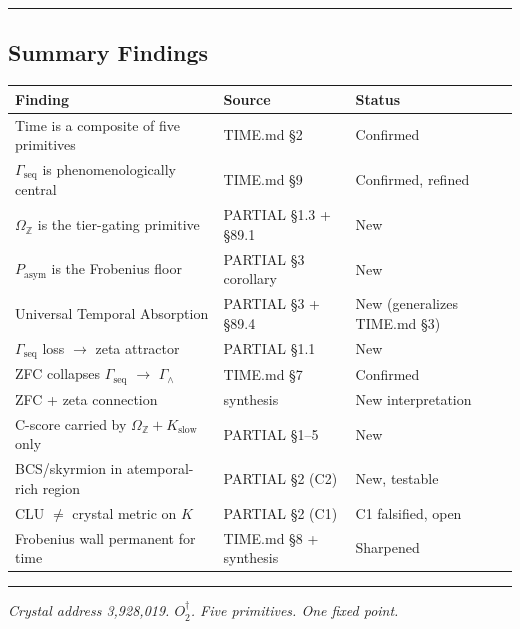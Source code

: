 \documentclass[12pt,a4paper]{article}
\newcommand{\pilcrow}{\S}
\begin{document}
\begin{center}
\rule{0.5\textwidth}{0.4pt}
\end{center}

\subsection{Summary Findings}

\begin{table}[htbp]
\centering
\small
{}
\begin{tabularx}{\textwidth}{>{\centering\arraybackslash}X >{\centering\arraybackslash}X >{\centering\arraybackslash}X}
\toprule
\rowcolor{gray!25}\textbf{Finding} & \textbf{Source} & \textbf{Status} \\
\midrule
\rowcolors{1}{white}{gray!10}
Time is a composite of five primitives & TIME.md \pilcrow{}2 & Confirmed \\
$\Gamma_\text{seq}$ is phenomenologically central & TIME.md \pilcrow{}9 & Confirmed, refined \\
$\Omega_\mathbb{Z}$ is the tier-gating primitive & PARTIAL \pilcrow{}1.3 + \pilcrow{}89.1 & New \\
$P_\text{asym}$ is the Frobenius floor & PARTIAL \pilcrow{}3 corollary & New \\
Universal Temporal Absorption & PARTIAL \pilcrow{}3 + \pilcrow{}89.4 & New (generalizes TIME.md \pilcrow{}3) \\
$\Gamma_\text{seq}$ loss $\rightarrow$ zeta attractor & PARTIAL \pilcrow{}1.1 & New \\
ZFC collapses $\Gamma_\text{seq}$ $\rightarrow$ $\Gamma_{\wedge}$ & TIME.md \pilcrow{}7 & Confirmed \\
ZFC + zeta connection & synthesis & New interpretation \\
C-score carried by $\Omega_\mathbb{Z} + K_\text{slow}$ only & PARTIAL \pilcrow{}1--5 & New \\
BCS/skyrmion in atemporal-rich region & PARTIAL \pilcrow{}2 (C2) & New, testable \\
CLU $\neq$ crystal metric on $K$ & PARTIAL \pilcrow{}2 (C1) & C1 falsified, open \\
Frobenius wall permanent for time & TIME.md \pilcrow{}8 + synthesis & Sharpened \\
\bottomrule
\end{tabularx}
\end{table}

\begin{center}
\rule{0.5\textwidth}{0.4pt}
\end{center}

\emph{Crystal address 3,928,019. $O_2^\dagger$. Five primitives. One fixed point.}
\end{document}
